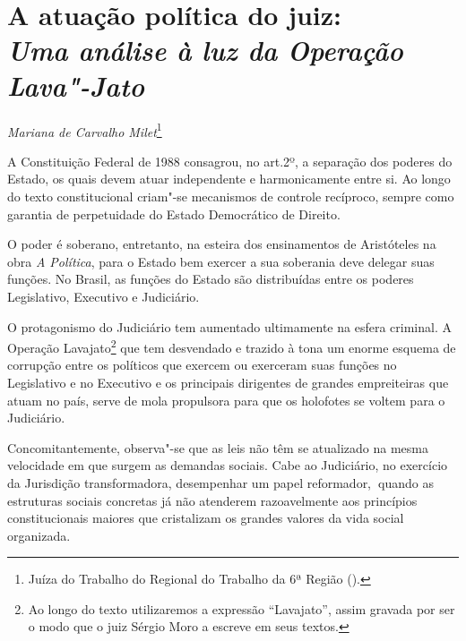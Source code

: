 \chapter*{A atuação política do juiz:\\
\emph{Uma análise à luz da Operação Lava"-Jato}}


\begin{flushright}
\emph{Mariana de Carvalho Milet}\footnote{Juíza do Trabalho do Regional do Trabalho da 6ª Região ().}
\end{flushright}




A Constituição Federal de 1988 consagrou, no art.2º, a separação dos
poderes do Estado, os quais devem atuar independente e harmonicamente
entre si. Ao longo do texto constitucional criam"-se mecanismos de
controle recíproco, sempre como garantia de perpetuidade do Estado
Democrático de Direito.

O poder é soberano, entretanto, na esteira dos ensinamentos de
Aristóteles na obra \emph{A Política}, para o Estado bem exercer a sua
soberania deve delegar suas funções. No Brasil, as funções do Estado são
distribuídas entre os poderes Legislativo, Executivo e Judiciário.

O protagonismo do Judiciário tem aumentado ultimamente na esfera
criminal. A Operação Lavajato\footnote{Ao longo do texto utilizaremos a
  expressão ``Lavajato'', assim gravada por ser o modo que o juiz Sérgio
  Moro a escreve em seus textos.} que tem desvendado e trazido à tona um
enorme esquema de corrupção entre os políticos que exercem ou exerceram
suas funções no Legislativo e no Executivo e os principais dirigentes de
grandes empreiteiras que atuam no país, serve de mola propulsora para
que os holofotes se voltem para o Judiciário.

Concomitantemente, observa"-se que as leis não têm se atualizado na mesma
velocidade em que surgem as demandas sociais. Cabe ao Judiciário, no
exercício da Jurisdição transformadora, desempenhar um papel
reformador,\textbf{~}quando as estruturas sociais concretas já não
atenderem razoavelmente aos princípios constitucionais maiores que
cristalizam os grandes valores da vida social organizada.

